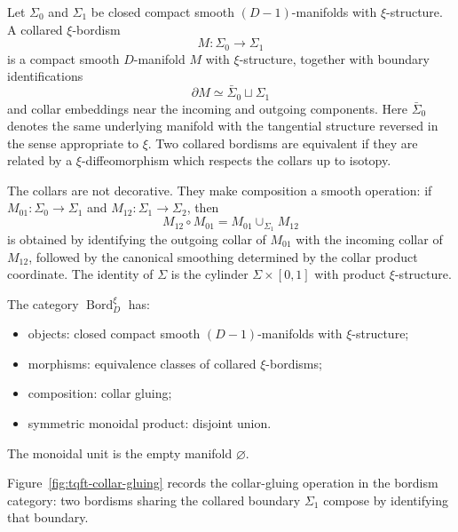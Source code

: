 \begin{definition}
\label{def:collared-xi-bordism}
Let \(\Sigma_0\) and \(\Sigma_1\) be closed compact smooth
\((D-1)\)-manifolds with \(\xi\)-structure.  A collared \(\xi\)-bordism
\[
  M:\Sigma_0\longrightarrow\Sigma_1
\]
is a compact smooth \(D\)-manifold \(M\) with \(\xi\)-structure, together
with boundary identifications
\[
  \partial M\simeq \bar\Sigma_0\sqcup\Sigma_1
\]
and collar embeddings near the incoming and outgoing components.  Here
\(\bar\Sigma_0\) denotes the same underlying manifold with the tangential
structure reversed in the sense appropriate to \(\xi\).  Two collared
bordisms are equivalent if they are related by a \(\xi\)-diffeomorphism
which respects the collars up to isotopy.
\end{definition}

The collars are not decorative.  They make composition a smooth operation:
if \(M_{01}:\Sigma_0\to\Sigma_1\) and \(M_{12}:\Sigma_1\to\Sigma_2\), then
\[
  M_{12}\circ M_{01}
  =
  M_{01}\cup_{\Sigma_1}M_{12}
\]
is obtained by identifying the outgoing collar of \(M_{01}\) with the
incoming collar of \(M_{12}\), followed by the canonical smoothing determined
by the collar product coordinate.  The identity of \(\Sigma\) is the
cylinder \(\Sigma\times[0,1]\) with product \(\xi\)-structure.

\begin{definition}
\label{def:ordinary-bordism-category}
The category \(\operatorname{Bord}^{\xi}_{D}\) has:
\begin{itemize}
\item objects: closed compact smooth \((D-1)\)-manifolds with
  \(\xi\)-structure;
\item morphisms: equivalence classes of collared \(\xi\)-bordisms;
\item composition: collar gluing;
\item symmetric monoidal product: disjoint union.
\end{itemize}
The monoidal unit is the empty manifold \(\varnothing\).
\end{definition}

Figure~\ref{fig:tqft-collar-gluing} records the collar-gluing operation in the
bordism category: two bordisms sharing the collared boundary \(\Sigma_1\)
compose by identifying that boundary.

